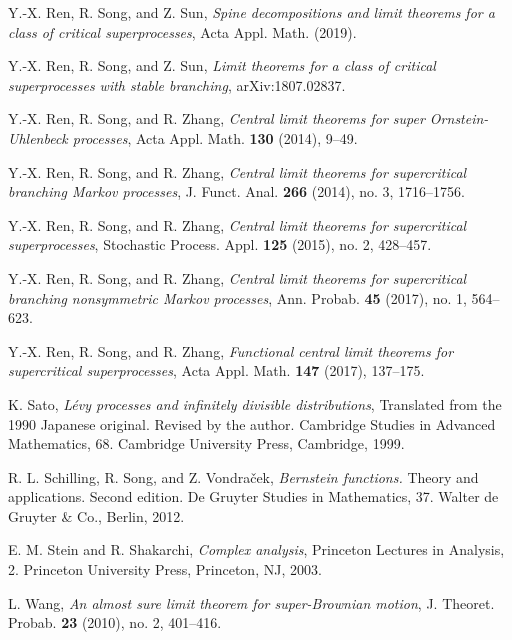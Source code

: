 \documentclass[EJP]{ejpecp} %
\begin{document}
\begin{thebibliography}{10}
  Y.-X. Ren, R. Song, and Z. Sun,
  \emph{Spine decompositions and limit theorems for a class of critical superprocesses},
  Acta Appl. Math. (2019).

  Y.-X. Ren, R. Song, and Z. Sun,
  \emph{Limit theorems for a class of critical superprocesses with stable branching},
  arXiv:1807.02837.

  Y.-X. Ren, R. Song, and R. Zhang,
  \emph{Central limit theorems for super {O}rnstein-{U}hlenbeck processes},
  Acta Appl. Math. \textbf{130} (2014), 9--49.

  Y.-X. Ren, R. Song, and R. Zhang,
  \emph{Central limit theorems for supercritical branching {M}arkov processes},
  J. Funct. Anal. \textbf{266} (2014), no. 3, 1716--1756.

  Y.-X. Ren, R. Song, and R. Zhang,
  \emph{Central limit theorems for supercritical superprocesses},
  Stochastic Process. Appl. \textbf{125} (2015), no. 2, 428--457.

  Y.-X. Ren, R. Song, and R. Zhang,
  \emph{Central limit theorems for supercritical branching nonsymmetric {M}arkov processes},
  Ann. Probab. \textbf{45} (2017), no. 1, 564--623.

  Y.-X. Ren, R. Song, and R. Zhang,
  \emph{Functional central limit theorems for supercritical superprocesses},
  Acta Appl. Math. \textbf{147} (2017), 137--175.

  K. Sato,
  \emph{L{\'e}vy processes and infinitely divisible distributions},
  Translated from the 1990 Japanese original. Revised by the author. Cambridge Studies in Advanced Mathematics, 68. Cambridge University Press, Cambridge, 1999.

  R. L. Schilling, R. Song, and Z. Vondra\v{c}ek,
  \emph{Bernstein functions.}
  Theory and applications. Second edition. De Gruyter Studies in Mathematics, 37. Walter de Gruyter \& Co., Berlin, 2012.

  E. M. Stein and R. Shakarchi, \emph{Complex analysis},
  Princeton Lectures in Analysis, 2. Princeton University Press, Princeton, NJ, 2003.

  L. Wang, \emph{An almost sure limit theorem for super-{B}rownian motion},
  J. Theoret. Probab. \textbf{23} (2010), no. 2, 401--416.

\end{thebibliography}
\end{document}

